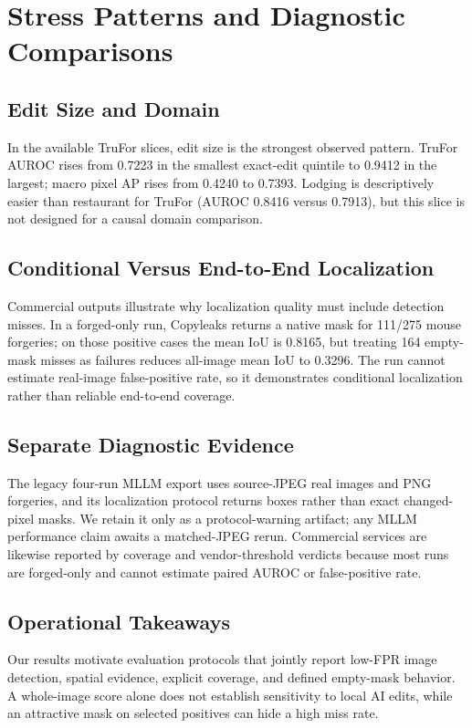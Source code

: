 \section{Stress Patterns and Diagnostic Comparisons}

\subsection{Edit Size and Domain}

In the available TruFor slices, edit size is the strongest observed pattern. TruFor AUROC rises from 0.7223 in the smallest exact-edit quintile to 0.9412 in the largest; macro pixel AP rises from 0.4240 to 0.7393. Lodging is descriptively easier than restaurant for TruFor (AUROC 0.8416 versus 0.7913), but this slice is not designed for a causal domain comparison.

\subsection{Conditional Versus End-to-End Localization}

Commercial outputs illustrate why localization quality must include detection misses. In a forged-only run, Copyleaks returns a native mask for 111/275 mouse forgeries; on those positive cases the mean IoU is 0.8165, but treating 164 empty-mask misses as failures reduces all-image mean IoU to 0.3296. The run cannot estimate real-image false-positive rate, so it demonstrates conditional localization rather than reliable end-to-end coverage.

\subsection{Separate Diagnostic Evidence}

The legacy four-run MLLM export uses source-JPEG real images and PNG forgeries, and its localization protocol returns boxes rather than exact changed-pixel masks. We retain it only as a protocol-warning artifact; any MLLM performance claim awaits a matched-JPEG rerun. Commercial services are likewise reported by coverage and vendor-threshold verdicts because most runs are forged-only and cannot estimate paired AUROC or false-positive rate.

\subsection{Operational Takeaways}

Our results motivate evaluation protocols that jointly report low-FPR image detection, spatial evidence, explicit coverage, and defined empty-mask behavior. A whole-image score alone does not establish sensitivity to local AI edits, while an attractive mask on selected positives can hide a high miss rate.
